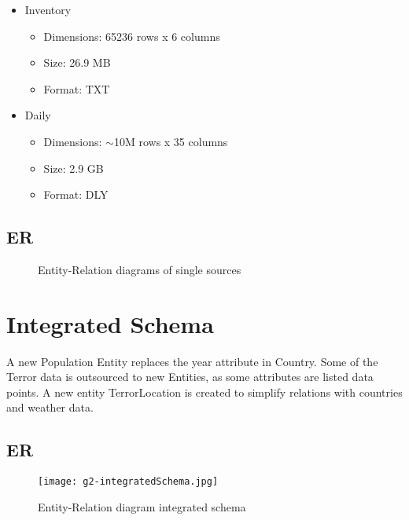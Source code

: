 \begin{itemize}
\begin{itemize}
		\item Inventory
		\begin{itemize}
		  \item Dimensions: 65236 rows x 6 columns
		  \item Size: 26.9 MB
		  \item Format: TXT
	    \end{itemize}
		\item Daily
		\begin{itemize}
		  \item Dimensions: $\sim$10M rows x 35 columns
		  \item Size: 2.9 GB
		  \item Format: DLY
	    \end{itemize}
	\end{itemize}
\end{itemize}


\subsection{ER}
\begin{figure}[hbt!]
    \qquad
    \qquad
    \qquad
    \qquad
    \caption{Entity-Relation diagrams of single sources}
\label{fig:example subfigure}
\end{figure}




\section{Integrated Schema}
A new Population Entity replaces the year attribute in Country. Some of the Terror data is outsourced to new Entities, as some attributes are listed data points. A new entity TerrorLocation is created to simplify relations with countries and weather data.

\subsection{ER}
\begin{figure}[hbt!]
	\texttt{[image: g2-integratedSchema.jpg]}
	\caption{Entity-Relation diagram integrated schema}
\end{figure}
    
